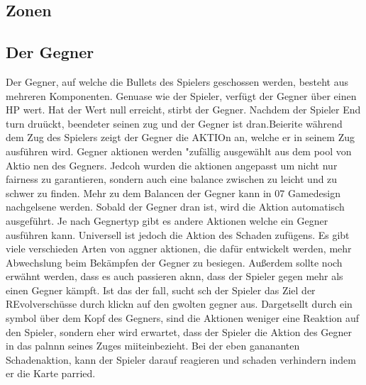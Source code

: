 

\subsection{Zonen}\label{backpack_and_deck}

\subsection{Der Gegner}\label{der_gegner}
Der Gegner, auf welche die Bullets des Spielers geschossen werden, besteht aus mehreren Komponenten.
Genuase wie der Spieler, verfügt der Gegner über einen HP wert. Hat der Wert null erreicht, stirbt der Gegner.
Nachdem der Spieler End turn druückt, beendeter seinen zug und der Gegner ist dran.Beierite während dem Zug des Spielers zeigt der Gegner die AKTIOn an, welche er in seinem Zug ausführen wird.
Gegner aktionen werden "zufällig ausgewählt aus dem pool von Aktio  nen des Gegners.
Jedcoh wurden die aktionen angepasst um nicht nur fairness zu garantieren,
sondern auch eine balance zwischen zu leicht und zu schwer zu finden.
Mehr zu dem Balancen der Gegner kann in 07 Gamedesign nachgelsene werden.
Sobald der Gegner dran ist, wird die Aktion automatisch ausgeführt. Je nach Gegnertyp gibt es andere Aktionen welche ein Gegner ausführen kann. Universell ist jedoch die Aktion des Schaden zufügens.
Es gibt viele verschieden Arten von aggner aktionen, die dafür entwickelt werden, mehr Abwechslung beim Bekämpfen der Gegner zu besiegen.
Außerdem sollte noch erwähnt werden, dass es auch passieren aknn, dass der Spieler gegen mehr als einen Gegner kämpft. Ist das der fall, sucht sch der Spieler das Ziel der REvolverschüsse durch klickn auf den gwolten gegner aus.
Dargetsellt durch ein symbol über dem Kopf des Gegners, sind die Aktionen weniger eine Reaktion auf den Spieler, sondern eher wird erwartet, dass der Spieler die Aktion des Gegner in das palnnn seines Zuges miiteinbezieht.
Bei der eben ganananten Schadenaktion, kann der Spieler darauf reagieren und schaden verhindern indem er die Karte parried.

